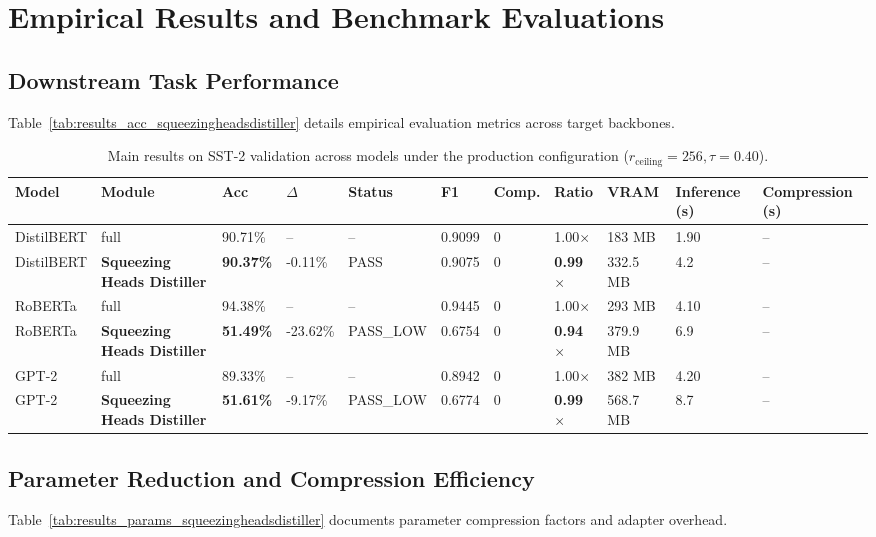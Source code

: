 \section{Empirical Results and Benchmark Evaluations}

\subsection{Downstream Task Performance}
Table~\ref{tab:results_acc_squeezingheadsdistiller} details empirical evaluation metrics across target backbones.

\begin{table}[t]
\centering
\small
\begin{tabular}{lllllllllll}
\toprule
\textbf{Model} & \textbf{Module} & \textbf{Acc} & \textbf{$\Delta$} & \textbf{Status} & \textbf{F1} & \textbf{Comp.} & \textbf{Ratio} & \textbf{VRAM} & \textbf{Inference (s)} & \textbf{Compression (s)} \\
\midrule
DistilBERT & full & 90.71\% & -- & -- & 0.9099 & 0 & 1.00$\times$ & 183 MB & 1.90 & -- \\
DistilBERT & \textbf{Squeezing Heads Distiller} & \textbf{90.37\%} & -0.11\% & PASS & 0.9075 & 0 & \textbf{0.99$\times$} & 332.5 MB & 4.2 & -- \\
RoBERTa & full & 94.38\% & -- & -- & 0.9445 & 0 & 1.00$\times$ & 293 MB & 4.10 & -- \\
RoBERTa & \textbf{Squeezing Heads Distiller} & \textbf{51.49\%} & -23.62\% & PASS\_LOW & 0.6754 & 0 & \textbf{0.94$\times$} & 379.9 MB & 6.9 & -- \\
GPT-2 & full & 89.33\% & -- & -- & 0.8942 & 0 & 1.00$\times$ & 382 MB & 4.20 & -- \\
GPT-2 & \textbf{Squeezing Heads Distiller} & \textbf{51.61\%} & -9.17\% & PASS\_LOW & 0.6774 & 0 & \textbf{0.99$\times$} & 568.7 MB & 8.7 & -- \\
\bottomrule
\end{tabular}
\caption{Main results on SST-2 validation across models under the production configuration ($r_{\mathrm{ceiling}}=256, \tau=0.40$).}
\label{tab:main_sst2}
\end{table}

\subsection{Parameter Reduction and Compression Efficiency}
Table~\ref{tab:results_params_squeezingheadsdistiller} documents parameter compression factors and adapter overhead.

